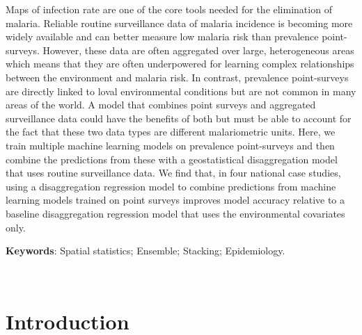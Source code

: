 \documentclass[11pt]{article}
\begin{document}
{Maps of infection rate are one of the core tools needed for the elimination of malaria.
Reliable routine surveillance data of malaria incidence is becoming more widely available and can better measure low malaria risk than prevalence point-surveys.
However, these data are often aggregated over large, heterogeneous areas which means that they are often underpowered for learning complex relationships between the environment and malaria risk.
In contrast, prevalence point-surveys are directly linked to loval environmental conditions but are not common in many areas of the world.
A model that combines point surveys and aggregated surveillance data could have the benefits of both but must be able to account for the fact that these two data types are different malariometric units.
Here, we train multiple machine learning models on prevalence point-surveys and then combine the predictions from these with a geostatistical disaggregation model that uses routine surveillance data.
We find that, in four national case studies, using a disaggregation regression model to combine predictions from machine learning models trained on point surveys improves model accuracy relative to a baseline disaggregation regression model that uses the environmental covariates only.                                  

{\bf Keywords}: Spatial statistics; Ensemble; Stacking; Epidemiology.
}\\



\section{Introduction}


\end{document}
